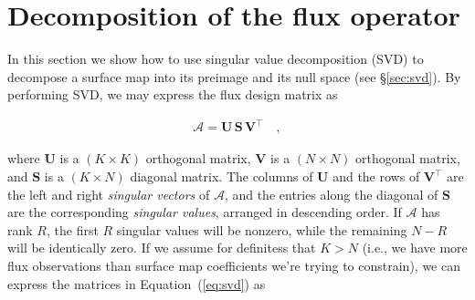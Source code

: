 \documentclass[modern,linenumbers]{aastex62}
\begin{document}
\section{Decomposition of the flux operator}
\label{sec:app-svd}
%
In this section we show how to use singular value decomposition (SVD)
to decompose a surface map
into its preimage and its null space (see \S\ref{sec:svd}). By performing SVD, we
may express the flux design matrix as
%
\begin{linenomath}\begin{align}
        \label{eq:svd}
        \pmb{\mathcal{A}} = \mathbf{U} \, \mathbf{S} \, \mathbf{V}^\top
        \quad,
    \end{align}\end{linenomath}
%
where $\mathbf{U}$ is a $(K \times K)$ orthogonal matrix,
$\mathbf{V}$ is a $(N \times N)$ orthogonal matrix,
and $\mathbf{S}$ is a $(K \times N)$ diagonal matrix.
%
The columns of $\mathbf{U}$ and the rows of $\mathbf{V}^\top$ are the left and right
\emph{singular vectors} of $\pmb{\mathcal{A}}$, and the entries along the
diagonal of $\mathbf{S}$ are the corresponding \emph{singular values}, arranged
in descending order. If $\pmb{\mathcal{A}}$
has rank $R$, the first $R$ singular values will be nonzero, while the
remaining $N - R$ will be identically zero.
%
If we assume for definitess that $K > N$ (i.e., we have more flux observations
than surface map coefficients we're trying to constrain), we can express the
matrices in Equation~(\ref{eq:svd}) as
%
\end{document}
